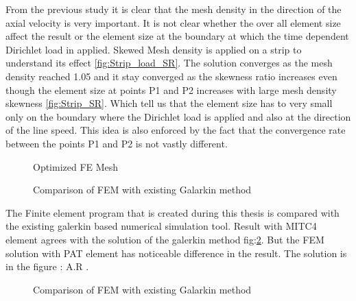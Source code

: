 \documentclass[main.tex]{subfiles}
\begin{document}
From the previous study it is clear that the mesh density in the direction of the axial velocity is very important. It is not clear whether the over all element size affect the result or the element size at the boundary at which the time dependent Dirichlet load in applied. Skewed Mesh density is applied on a strip to understand its effect \ref{fig:Strip_load_SR}. The solution converges as the mesh density reached 1.05 and it stay converged as the skewness ratio increases even though the element size at points P1 and P2 increases with large mesh density skewness \ref{fig:Strip_SR}. Which tell us that the element size has to very small only on the boundary where the Dirichlet load is applied and also at the direction of the line speed. This idea is also enforced by the fact that the convergence rate between the points P1 and P2 is not vastly different. 

\begin{figure}[h!]
\centering

\caption{Optimized FE Mesh}
\label{fig:strip_mesh_zoom}
\end{figure}

\begin{figure}[h!]
\centering

\caption{Comparison of FEM with existing Galarkin method}
\label{fig:FEMvsGAL_Plot}
\end{figure}




The Finite element program that is created during this thesis is compared with the existing galerkin based numerical simulation tool. Result with MITC4 element agrees with the solution of the galerkin method fig:\ref{fig:FEMvsGAL_Plot}. But the FEM solution with PAT element has noticeable difference in the result. The solution is in the figure : A.R .


\begin{figure}[h!]
\centering

\caption{Comparison of FEM with existing Galarkin method}
\label{fig:Strip_Para_V}
\end{figure}


\end{document}
